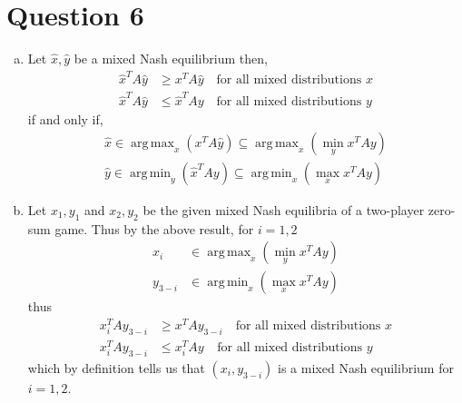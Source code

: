 \documentclass[a4paper,12pt]{article}
\theoremstyle{definition}
\DeclareMathOperator*{\argmax}{arg\,max}
\DeclareMathOperator*{\argmin}{arg\,min}
\begin{document}
\section*{Question 6}
\begin{enumerate}[(a)]
\item %
Let $\hat{x}, \hat{y}$ be a mixed Nash equilibrium then,
\begin{align}
\hat{x}^TA\hat{y}&\geq x^TA\hat{y} \quad \text{for all mixed distributions $x$}\\
\hat{x}^TA\hat{y}&\leq \hat{x}^TAy \quad \text{for all mixed distributions $y$}
\end{align}
if and only if,
\begin{align*}
\hat{x}\in\argmax_x \left(x^TA \hat{y}\right)\subseteq\argmax_x\left(\min_yx^TAy\right)\\
\hat{y}\in\argmin_y \left(\hat{x}^T Ay\right)\subseteq\argmin_x\left(\max_xx^TAy\right)
\end{align*}

\item Let $x_1,y_1$ and $x_2,y_2$ be the given mixed Nash equilibria of a two-player zero-sum game. Thus by the above result, for $i=1,2$
\begin{align*}
x_i &\in \argmax_x\left(\min_yx^TAy\right)\\
y_{3-i} & \in\argmin_x\left(\max_xx^TAy\right)
\end{align*}
thus
\begin{align*}
x_i^TAy_{3-i}&\geq x^TAy_{3-i} \quad \text{for all mixed distributions $x$}\\
x_i^TAy_{3-i}&\leq x_i^TAy_{} \quad \text{for all mixed distributions $y$}
\end{align*}
which by definition tells us that $(x_i,y_{3-i})$ is a mixed Nash equilibrium for $i=1,2$.
\end{enumerate}
\end{document}
